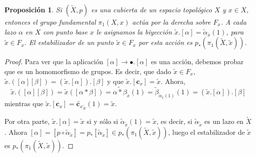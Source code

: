\documentclass[12pt,a4paper]{book}
\newtheorem{prop}[thm]{Proposición}
\theoremstyle{definition} \newtheorem{defn}[thm]{Definición}
\theoremstyle{definition} \newtheorem{ejemplo}[thm]{Ejemplo}
\theoremstyle{definition} \newtheorem{ejercicio}[thm]{Ejercicio}
\theoremstyle{remark} \newtheorem*{obs}{Observación}
\def\cc{\mathbf{c}}
\def\gf{\pi_1}
\def\XX{\tilde{X}}
\def\xx{\tilde{x}}
\begin{document}
\begin{prop}\label{actuafibra}
  Si $(\XX,p)$ es una cubierta de un espacio topológico $X$ y $x\in X$, entonces el grupo fundamental $\gf(X,x)$ actúa por la derecha sobre $F_x$. A cada lazo $\alpha$ en $X$ con punto base $x$ le asignamos la biyección $\xx.[\alpha]=\tilde{\alpha}_{\xx}(1)$, para $\xx \in F_x$. El estabilizador de un punto $\xx\in F_x$ por esta acción es $p_*(\gf(\XX,\xx))$.
\end{prop}
\begin{proof}
  Para ver que la aplicación $[\alpha]\rightarrow \bullet.[\alpha]$ es una acción, debemos probar que es un homomorfismo de grupos. Es decir, que dado $\xx\in F_x$, $\xx.([\alpha][\beta])=(\xx.[\alpha]).[\beta]$ y que $\xx.[\cc_x]=\xx$. Ahora,
  \begin{equation*}
    \xx.([\alpha][\beta])=\xx([\alpha*\beta])=\widetilde{\alpha*\beta}_{\xx}(1)=\tilde{\beta}_{\tilde{\alpha}_{\xx}(1)}(1)=(\xx.[\alpha]).[\beta]
  \end{equation*}
  mientras que $\xx.[\cc_x]=\tilde{\cc_x}_{\xx}(1)=\xx$.

  Por otra parte, $\xx.[\alpha]=\xx$ si y sólo si $\tilde{\alpha}_{\xx}(1)=\xx$, es decir, si $\tilde{\alpha}_{\xx}$ es un lazo en $\XX$. Ahora $[\alpha]=[p\circ \tilde{\alpha}_{\xx}]=p_*[\tilde{\alpha}_{\xx}]\in p_*(\gf(\XX,\xx))$, luego el estabilizador de $\xx$ es $p_*(\gf(\XX,\xx))$.
\end{proof}
\end{document}
